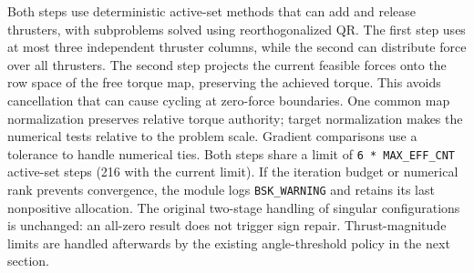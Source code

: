 Both steps use deterministic active-set methods that can add and release thrusters, with subproblems solved using reorthogonalized QR.  The first step uses at most three independent thruster columns, while the second can distribute force over all thrusters.  The second step projects the current feasible forces onto the row space of the free torque map, preserving the achieved torque.  This avoids cancellation that can cause cycling at zero-force boundaries.  One common map normalization preserves relative torque authority; target normalization makes the numerical tests relative to the problem scale.  Gradient comparisons use a tolerance to handle numerical ties.  Both steps share a limit of {\tt 6 * MAX\_EFF\_CNT} active-set steps (216 with the current limit).  If the iteration budget or numerical rank prevents convergence, the module logs {\tt BSK\_WARNING} and retains its last nonpositive allocation.  The original two-stage handling of singular configurations is unchanged: an all-zero result does not trigger sign repair.  Thrust-magnitude limits are handled afterwards by the existing angle-threshold policy in the next section.



